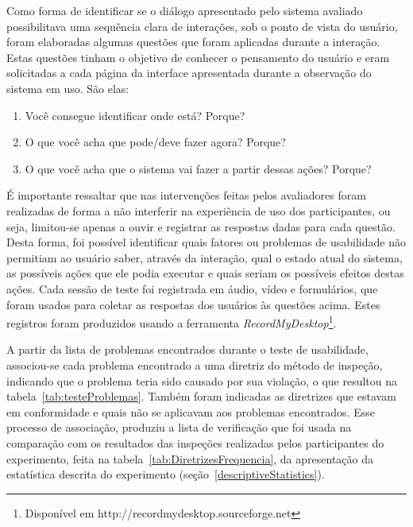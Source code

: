 Como  forma  de identificar  se  o  diálogo  apresentado pelo  sistema
avaliado possibilitava uma sequência  clara de interações, sob o ponto
de  vista do  usuário,  foram elaboradas  algumas  questões que  foram
aplicadas durante  a interação.  Estas  questões tinham o  objetivo de
conhecer o pensamento  do usuário e eram solicitadas  a cada página da
interface  apresentada durante  a observação  do sistema  em  uso. São
elas:

\begin{enumerate}
  \renewcommand{\labelenumi}{\alph{enumi})}

  \item Você consegue identificar onde está? Porque?
  \item O que você acha que pode/deve fazer agora? Porque?
  \item O que você acha que o sistema vai fazer a partir dessas ações?
    Porque?
\end{enumerate} 

É importante  ressaltar que nas intervenções  feitas pelos avaliadores
foram realizadas de  forma a não interferir na  experiência de uso dos
participantes,  ou seja,  limitou-se  apenas a  ouvir  e registrar  as
respostas  dadas  para  cada   questão.   Desta  forma,  foi  possível
identificar quais fatores ou problemas de usabilidade não permitiam ao
usuário saber, através  da interação, qual o estado  atual do sistema,
as possíveis ações que ele  podia executar e quais seriam os possíveis
efeitos destas ações.   Cada sessão de teste foi  registrada em áudio,
vídeo e  formulários, que foram  usados para coletar as  respostas dos
usuários às questões acima.  Estes registros foram produzidos usando a
ferramenta      {\em      RecordMyDesktop}\footnote{Disponível      em
  http://recordmydesktop.sourceforge.net}.

A  partir  da  lista  de  problemas encontrados  durante  o  teste  de
usabilidade, associou-se  cada problema  encontrado a uma  diretriz do
método de  inspeção, indicando que  o problema teria sido  causado por
sua  violação,  o  que  resultou  na  tabela~\ref{tab:testeProblemas}.
Também  foram indicadas as  diretrizes que  estavam em  conformidade e
quais não  se aplicavam aos  problemas encontrados.  Esse  processo de
associação,  produziu  a  lista   de  verificação  que  foi  usada  na
comparação   com  os   resultados  das   inspeções   realizadas  pelos
participantes         do         experimento,         feita         na
tabela~\ref{tab:DiretrizesFrequencia}, da  apresentação da estatística
descrita do experimento (seção~\ref{descriptiveStatistics}).

